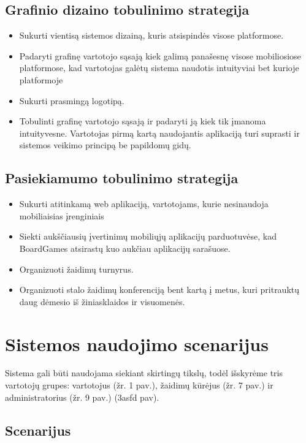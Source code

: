 \documentclass{VUMIFPSkursinis}
\begin{document}
	\subsection {Grafinio dizaino tobulinimo strategija}
		\renewcommand{\labelitemi}{$\bullet$}
			\begin{itemize}
				\item Sukurti vientisą sistemos dizainą, kuris atsispindės visose platformose.
				\item Padaryti grafinę vartotojo sąsają kiek galimą panašesnę visose mobiliosiose platformose, kad vartotojas galėtų sistema naudotis intuityviai bet kurioje platformoje
				\item Sukurti prasmingą logotipą.
				\item Tobulinti grafinę vartotojo sąsają ir padaryti ją kiek tik įmanoma intuityvesne. Vartotojas pirmą kartą naudojantis aplikaciją turi suprasti ir sistemos veikimo principą be papildomų gidų. 
			\end{itemize}		
	\subsection {Pasiekiamumo tobulinimo strategija}
		\renewcommand{\labelitemi}{$\bullet$}
			\begin{itemize}
				\item Sukurti atitinkamą web aplikaciją, vartotojams, kurie nesinaudoja mobiliaisias įrenginiais
				\item Siekti aukščiausių įvertinimų mobiliųjų aplikacijų parduotuvėse, kad BoardGames atsirastų kuo aukčiau aplikacijų sarašuose.
				\item Organizuoti žaidimų turnyrus.
				\item Organizuoti stalo žaidimų konferenciją bent kartą į metus, kuri pritrauktų daug dėmesio iš žiniasklaidos ir visuomenės. 
			\end{itemize}			
\section{Sistemos naudojimo scenarijus}
Sistema gali būti naudojama siekiant skirtingų tikslų, todėl išskyrėme tris 
vartotojų grupes: vartotojus (žr. 1 pav.), žaidimų kūrėjus (žr. 7 pav.) ir administratorius (žr. 9 pav.)
(3asfd pav).
	\subsection {Scenarijus}
\end{document}
